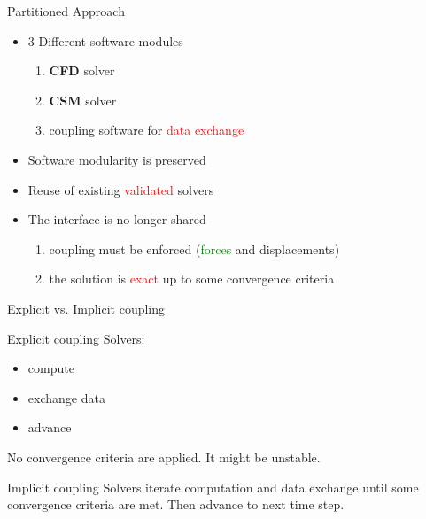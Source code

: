 \documentclass[10pt,t]{beamer}
\begin{document}
\begin{frame}{Partitioned Approach}
    \begin{itemize}
        \item  3 Different software modules
            \begin{enumerate}
                \itemsep 5pt
                \item \textbf{CFD} solver
                \item \textbf{CSM} solver
                \item coupling software for \textcolor{red}{data exchange}
            \end{enumerate}
        \vspace{5mm}
        \pause
        \item Software modularity is preserved
        \item Reuse of existing \textcolor{red}{validated} solvers
        
        \vspace{5mm}
        \pause
        
        \item The interface is no longer shared
        
        \begin{enumerate}
            \itemsep 5pt
            \item coupling must be enforced (\textcolor{green}{forces} and \textcolor{pblue}{displacements})
            \item the solution is \textcolor{red}{exact} up to some convergence criteria
        \end{enumerate}
    \end{itemize}
\end{frame}


\begin{frame}{Explicit vs. Implicit coupling}

\begin{block}{Explicit coupling}
Solvers:
\begin{itemize}
    \item \textcolor{dblue}{compute}
    \item \textcolor{fgreen}{exchange data}
    \item \textcolor{dorange}{advance} 
\end{itemize}
No convergence criteria are applied. It might be unstable.
\end{block}

\pause

\vspace{5mm}
\begin{exampleblock}{Implicit coupling}
Solvers iterate \textcolor{dblue}{computation} and \textcolor{fgreen}{data exchange} until some convergence criteria are met. Then \textcolor{dorange}{advance} to next time step.
\end{exampleblock}
\label{coupling}
\hyperlink{couplingdetails}{}

\end{frame}
\end{document}
